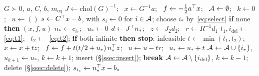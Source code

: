 \begin{algorithm}[ht]
\caption{The Goldfarb--Idnani dual active-set method}\label{alg:gi}
\begin{algorithmic}[1]
\Require $G \succ 0$, $a$, $C$, $b$, $m_{\mathrm{eq}}$
\State $J \leftarrow \mathrm{chol}(G)^{-1}$; \ $x \leftarrow G^{-1}a$; \
       $f \leftarrow -\tfrac12 a^{\top} x$; \ $\mathcal{A} \leftarrow \emptyset$; \
       $k \leftarrow 0$; \ $u \leftarrow ()$
\Loop
  \State $s \leftarrow C^{\top} x - b$, with $s_i \leftarrow 0$ for $i \in \mathcal{A}$;
         choose $i_*$ by~\eqref{eq:select}
  \State \textbf{if} none \textbf{then} \Return $(x,f,u)$
  \State $n_* \leftarrow c_{i_*}$; \ $u_* \leftarrow 0$
  \Loop
    \State $d \leftarrow J^{\top} n_*$; \ $z \leftarrow J_2 d_2$; \
           $r \leftarrow R^{-1} d_1$
    \State $t_1, i_{\mathrm{del}} \leftarrow$ \eqref{eq:t1}; \
           $t_2 \leftarrow$ \eqref{eq:t2};
           \textbf{if} both infinite \textbf{then stop}: infeasible
    \State $t \leftarrow \min(t_1,t_2)$; \ $x \leftarrow x + tz$; \
           $f \leftarrow f + t(t/2 + u_*)\,n_*^{\top} z$; \
           $u \leftarrow u - tr$; \ $u_* \leftarrow u_* + t$
    \If{$t_2 \le t_1$}
      \State $\mathcal{A} \leftarrow \mathcal{A} \cup \{i_*\}$, $u_{k+1} \leftarrow u_*$,
             $k \leftarrow k+1$; insert (\S\ref{ssec:insert}); \textbf{break}
    \Else
      \State $\mathcal{A} \leftarrow \mathcal{A} \setminus \{i_{\mathrm{del}}\}$,
             $k \leftarrow k-1$; delete (\S\ref{ssec:delete});
             $s_{i_*} \leftarrow n_*^{\top} x - b_*$
    \EndIf
  \EndLoop
\EndLoop
\end{algorithmic}
\end{algorithm}
